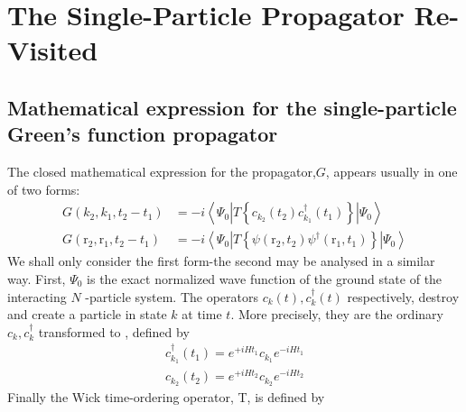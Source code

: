 \newpage
\section{The Single-Particle Propagator Re-Visited}
\subsection{Mathematical expression for the single-particle Green's function propagator}
The closed mathematical expression for the propagator,$G$, appears usually in one of two forms:
\begin{equation}\begin{aligned}
G\left(k_{2}, k_{1}, t_{2}-t_{1}\right) &=-i\left\langle\Psi_{0}\left|T\left\{c_{k_{2}}\left(t_{2}\right) c^{\dagger}_{k_{1}}\left(t_{1}\right)\right\}\right| \Psi_{0}\right\rangle \\
G\left(\mathrm{r}_{2}, \mathrm{r}_{1}, t_{2}-t_{1}\right) &=-i\left\langle\Psi_{0}\left|T\left\{\psi\left(\mathrm{r}_{2}, t_{2}\right) \psi^{\dagger}\left(\mathrm{r}_{1}, t_{1}\right)\right\}\right| \Psi_{0}\right\rangle
\end{aligned}
\label{sandwitch-defi-G}
\end{equation}
We shall only consider the first form-the second may be analysed in a similar way. First, $\Psi_{0}$ is the exact normalized wave function of the ground state of the interacting $N$ -particle system. The operators $c_{k}(t), c_{k}^{\dagger}(t)$ respectively, destroy and create a particle in state $k$ at time $t .$ More precisely, they are the ordinary $c_{k}, c_{k}^{\dagger}$ transformed to , defined by
\begin{equation}\begin{array}{l}
c^{\dagger}_{k_{1}}\left(t_{1}\right)=e^{+i Ht_{1}} c_{k_{1}} e^{-i H t_{1}} \\
c_{k_{2}}\left(t_{2}\right)=e^{+i Ht_2} c_{k_{2}} e^{-i Ht_{2}}
\end{array}\end{equation}
Finally the Wick time-ordering operator, T, is defined by
